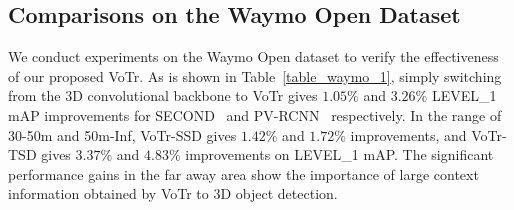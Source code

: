 \documentclass[10pt,twocolumn,letterpaper]{article}
\begin{document}
\begin{table}[]
\setlength{\belowcaptionskip}{10pt}
\caption{Performance comparison on the KITTI \textit{val} split with AP calculated by $11$ recall positions for the car category.} \label{table_kitti_2}
\vspace{-4mm}
\end{table}

\subsection{Comparisons on the Waymo Open Dataset} \label{3D Detection on the Waymo Open Dataset} 
We conduct experiments on the Waymo Open dataset to verify the effectiveness of our proposed VoTr. As is shown in Table~\ref{table_waymo_1}, simply switching from the 3D convolutional backbone to VoTr gives $1.05\%$ and $3.26\%$ LEVEL\_1 mAP improvements for SECOND~\cite{yan2018second} and PV-RCNN~\cite{shi2020pv} respectively. In the range of 30-50m and 50m-Inf, VoTr-SSD gives $1.42\%$ and $1.72\%$ improvements, and VoTr-TSD gives $3.37\%$ and $4.83\%$ improvements on LEVEL\_1 mAP. The significant performance gains in the far away area show the importance of large context information obtained by VoTr to 3D object detection.
\end{document}

